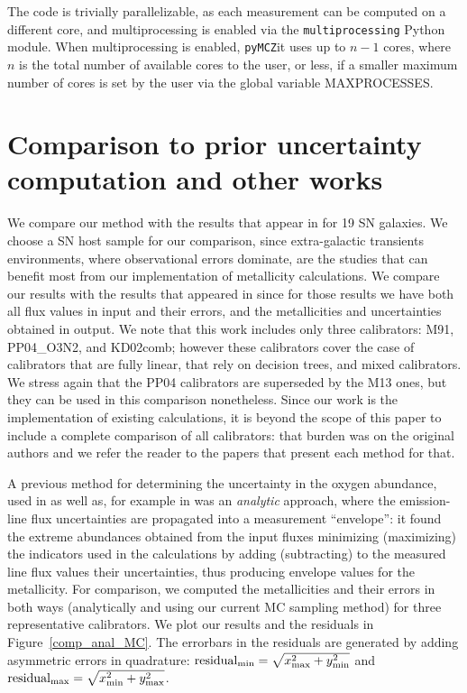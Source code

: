 \documentclass{emulateapj} \usepackage{amsmath} \usepackage{float}
\begin{document}
The code is trivially parallelizable, as each measurement can be
computed on a different core, and multiprocessing is enabled via the
\verb=multiprocessing= Python module. When multiprocessing is enabled,
\verb=pyMCZ=it uses up to $n-1$ cores, where $n$ is the total number
of available cores to the user, or less, if a smaller maximum number
of cores is set by the user via the global variable MAXPROCESSES.







\section{Comparison to prior uncertainty computation and other works }\label{comp_sec}

We compare our method with the results that appear in
\citealt{modjaz11} for 19 SN galaxies. We choose a SN host sample for
our comparison, since extra-galactic transients environments, where observational errors dominate, are the studies that can benefit most from our implementation of metallicity calculations. We compare our results with the results that
appeared in \citealt{modjaz11} since for those results we have both
all flux values in input and their errors, and the metallicities and
uncertainties obtained in output. We note that this work includes only three calibrators: M91, PP04\_O3N2, and KD02comb; however these calibrators cover the case of calibrators that are fully linear, that rely on decision trees, and mixed calibrators. We stress again that the PP04 calibrators are superseded by the M13 ones, but they can be used in this comparison nonetheless. Since our work is the implementation of existing calculations, it is beyond the scope of this paper to include a complete comparison of all calibrators: that burden was on the original authors and we refer the reader to the papers that present each method for that. 

A previous method for determining
the uncertainty in the oxygen abundance, used in \citealt{modjaz11} as
well as, for example in \citealt{modjaz08_Z,kewley10,rupke10} was an
\emph{analytic} approach, where the emission-line flux uncertainties
are propagated into a measurement ``envelope'': it found the extreme
abundances obtained from the input fluxes minimizing (maximizing)
the indicators used in the calculations by adding (subtracting) to the
measured line flux values their uncertainties, thus producing
envelope values for the metallicity. For comparison, we computed the
metallicities and their errors in both ways (analytically and using
our current MC sampling method) for three representative
calibrators. We plot our results and the residuals in
Figure~\ref{comp_anal_MC}.  The errorbars in the residuals are
generated by adding asymmetric errors in quadrature:
$\mathrm{residual}_{\rm min}=\sqrt {x_{\rm max}^2 + y_{\rm min}^2}$
and $\mathrm{residual}_{\rm max}=\sqrt{x_{\rm min}^2 + y_{\rm
    max}^2}$.
\end{document}
